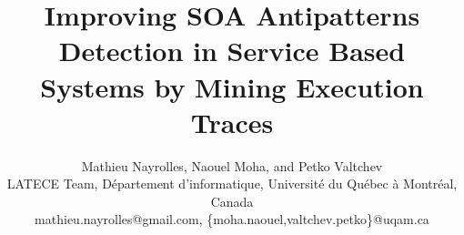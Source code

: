 \documentclass[conference]{IEEEtran}
\theoremstyle{plain}
\theoremstyle{plain}
\begin{document}
\title{Improving SOA Antipatterns Detection in Service Based Systems by Mining Execution Traces}

\author{Mathieu Nayrolles, Naouel Moha, and Petko Valtchev\\
LATECE Team, D\'epartement d'informatique, Universit\'e du Qu\'ebec \`a Montr\'eal, Canada\\
mathieu.nayrolles@gmail.com, \{moha.naouel,valtchev.petko\}@uqam.ca}

\maketitle
\thispagestyle{empty}








\vspace{0.2cm}


\end{document}
